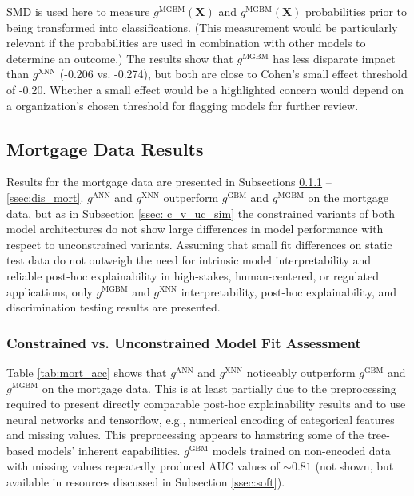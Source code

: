 \documentclass[information,article,submit,moreauthors,pdftex]{definitions/mdpi}
\begin{document}
\noindent SMD is used here to measure $g^\text{MGBM}(\mathbf{X})$ and $g^\text{MGBM}(\mathbf{X})$ probabilities prior to being transformed into classifications.  (This measurement would be particularly relevant if the probabilities are used in combination with other models to determine an outcome.)  The results show that $g^\text{MGBM}$ has less disparate impact than $g^\text{XNN}$ (-0.206 vs. -0.274), but both are close to Cohen’s small effect threshold of -0.20. Whether a small effect would be a highlighted concern would depend on a organization’s chosen threshold for flagging models for further review. 

\subsection{Mortgage Data Results}

Results for the mortgage data are presented in Subsections \ref{ssec:c_v_uc_mort} -- \ref{ssec:dis_mort}.  $g^\text{ANN}$ and $g^\text{XNN}$ outperform $g^\text{GBM}$ and $g^\text{MGBM}$ on the mortgage data, but as in Subsection \ref{ssec: c_v_uc_sim} the constrained variants of both model architectures do not show large differences in model performance with respect to unconstrained variants. Assuming that small fit differences on static test data do not outweigh the need for intrinsic model interpretability and reliable post-hoc explainability in high-stakes, human-centered, or regulated applications, only $g^\text{MGBM}$ and $g^\text{XNN}$ interpretability, post-hoc explainability, and discrimination testing results are presented. 

\subsubsection{Constrained vs. Unconstrained Model Fit Assessment}\label{ssec:c_v_uc_mort}

Table \ref{tab:mort_acc} shows that $g^\text{ANN}$ and $g^\text{XNN}$ noticeably outperform $g^\text{GBM}$ and $g^\text{MGBM}$ on the mortgage data. This is at least partially due to the preprocessing required to present directly comparable post-hoc explainability results and to use neural networks and tensorflow, e.g., numerical encoding of categorical features and missing values. This preprocessing appears to hamstring some of the tree-based models' inherent capabilities. $g^\text{GBM}$ models trained on non-encoded data with missing values repeatedly produced AUC values of $\sim0.81$ (not shown, but available in resources discussed in Subsection \ref{ssec:soft}). 
\end{document}
